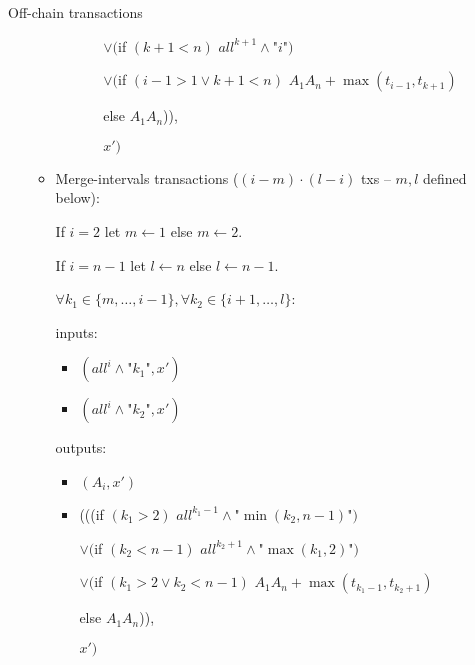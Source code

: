 \begin{notitlebox}{Off-chain transactions}
\begin{itemize}
\begin{itemize}
\begin{itemize}
\begin{itemize}
          $\vee ($if $(k+1 < n)$ $\mathit{all}^{k+1} \wedge \texttt{"}i\texttt{"})$

          $\vee ($if $(i-1 > 1 \vee k+1 < n)$ $A_1 A_n+\max{(t_{i-1}, t_{k+1})}$

          \:\:\: else $A_1 A_n$)),

          $x')$
        \end{itemize}
      \end{itemize}
      \item Merge-intervals transactions ($(i-m)\cdot(l-i)$ txs -- $m, l$
      defined below):

      If $i = 2$ let $m \gets 1$ else $m \gets 2$.

      If $i = n-1$ let $l \gets n$ else $l \gets n-1$.

      $\forall k_1 \in \{m, \dots, i-1\}, \forall k_2 \in \{i+1, \dots, l\}$:

      inputs:
      \begin{itemize}
        \item $(\mathit{all}^i \wedge \texttt{"}k_1\texttt{"}, x')$
        \item $(\mathit{all}^i \wedge \texttt{"}k_2\texttt{"}, x')$
      \end{itemize}
      outputs:
      \begin{itemize}
        \item $(A_i, x')$
        \item (((if $(k_1 > 2)$ $\mathit{all}^{k_1-1} \wedge
        \texttt{"}\min{(k_2, n-1)}\texttt{"})$

        $\vee ($if $(k_2 < n - 1)$ $\mathit{all}^{k_2+1} \wedge
        \texttt{"}\max{(k_1, 2)}\texttt{"})$

        $\vee ($if $(k_1 > 2 \vee k_2 < n-1)$ $A_1 A_n+\max{(t_{k_1-1},
        t_{k_2+1})}$

        \:\:\: else $A_1 A_n$)),

        $x')$
      \end{itemize}
    \end{itemize}
  \end{itemize}
\end{notitlebox}
